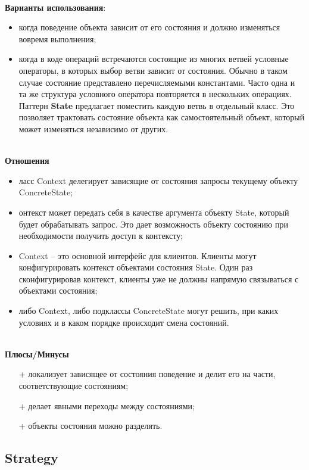 \documentclass[a3paper,11pt]{report}
\begin{document}
\large\textbf{\\Варианты использования}:
\begin{itemize}
\item когда поведение объекта зависит от его состояния и должно изменяться вовремя выполнения;
\item когда в коде операций встречаются состоящие из многих ветвей условные операторы, в которых выбор ветви зависит от состояния. Обычно в таком случае состояние представлено перечисляемыми константами. Часто одна и та же структура условного оператора повторяется в нескольких операциях. Паттерн \textbf{State} предлагает поместить каждую ветвь в отдельный класс. Это позволяет трактовать состояние объекта как самостоятельный объект, который может изменяться независимо от других.
\end{itemize}

\textbf{\\Отношения}
\begin{itemize}
\item ласс Context делегирует зависящие от состояния запросы текущему объекту ConcreteState;
\item онтекст может передать себя в качестве аргумента объекту State, который будет обрабатывать запрос. Это дает возможность объекту состоянию при необходимости получить доступ к контексту;
\item Context – это основной интерфейс для клиентов. Клиенты могут конфигурировать контекст объектами состояния State. Один раз сконфигурировав контекст, клиенты уже не должны напрямую связываться с объектами состояния;
\item либо Context, либо подклассы ConcreteState могут решить, при каких условиях и в каком порядке происходит смена состояний.
\end{itemize}

\textbf{\\Плюсы/Минусы}
\begin{itemize}
\item [+] локализует зависящее от состояния поведение и делит его на части, соответствующие состояниям;
\item [+] делает явными переходы между состояниями;
\item [+] объекты состояния можно разделять.
\end{itemize}

\newpage
\subsection{Strategy}
\end{document}
